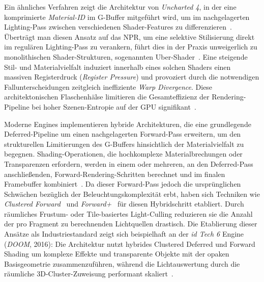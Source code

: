 Ein ähnliches Verfahren zeigt die Architektur von \textit{Uncharted 4}, in der eine komprimierte \textit{Material-ID} im
\ac{G-Buffer} mitgeführt wird, um im nachgelagerten Lighting-Pass zwischen verschiedenen Shader-Features zu
differenzieren~\cite[Folie~\enquote{Deferred Pipeline}]{deferredLightinginUncharted4}.
Überträgt man diesen Ansatz auf das \ac{NPR}, um eine selektive Stilisierung direkt im regulären Lighting-Pass zu verankern,
führt dies in der Praxis unweigerlich zu monolithischen
Shader-Strukturen, sogenannten
Uber-Shader~\cite[Folie~\enquote{Problems}]{deferredLightinginUncharted4}.
Eine steigende Stil- und Materialvielfalt induziert innerhalb eines solchen Shaders einen massiven Registerdruck
(\textit{Register Pressure}) und provoziert durch die notwendigen Fallunterscheidungen zeitgleich ineffiziente
\textit{Warp Divergence}.
Diese architektonischen Flaschenhälse limitieren die
Gesamteffizienz der Rendering-Pipeline bei hoher Szenen-Entropie auf der \ac{GPU}
signifikant~\cite[Abschn.~6]{schiedDeferredAttributeInterpolation2015}.

Moderne Engines implementieren hybride Architekturen, die eine grundlegende Deferred-Pipeline um einen nachgelagerten
Forward-Pass erweitern, um den strukturellen Limitierungen des \ac{G-Buffer}s hinsichtlich der Materialvielfalt zu
begegnen.
Shading-Operationen, die hochkomplexe Materialbrechungen oder Transparenzen erfordern, werden in einem oder mehreren, an
den Deferred-Pass anschließenden, Forward-Rendering-Schritten berechnet und im finalen Framebuffer
kombiniert~\cite[S.~887]{akenine-mollerRealtimeRendering2019}.
Da dieser Forward-Pass jedoch die ursprünglichen Schwächen bezüglich der Beleuchtungskomplexität erbt, haben sich
Techniken wie \textit{Clustered Forward}~\cite{olssonClusteredDeferredForward2012} und
\textit{Forward+}~\cite{haradaForwardBringingDeferred2012} für diesen Hybridschritt etabliert.
Durch räumliches Frustum- oder Tile-basiertes Light-Culling reduzieren sie die Anzahl der pro Fragment zu berechnenden
Lichtquellen drastisch.
Die Etablierung dieser Ansätze als Industriestandard zeigt sich beispielhaft an der \textit{id Tech 6} Engine
(\textit{DOOM}, 2016): Die Architektur nutzt hybrides Clustered Deferred und Forward Shading um komplexe
Effekte und transparente Objekte mit der opaken Basisgeometrie zusammenzuführen, während die Lichtauswertung
durch die räumliche 3D-Cluster-Zuweisung performant skaliert~\cite{DOOM}.

